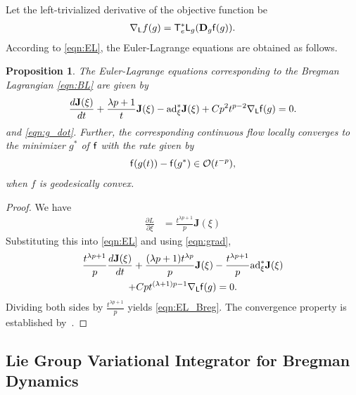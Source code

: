 \documentclass[letterpaper, 10pt, conference]{ieeeconf}
\newcommand{\deriv}[2]{\ensuremath{\frac{\partial #1}{\partial #2}}}
\newcommand{\T}{\ensuremath{\mathsf{T}}}
\renewcommand{\L}{\ensuremath{\mathsf{L}}}
\newcommand{\D}{\ensuremath{\mathbf{D}}}
\newcommand{\ad}{\ensuremath{\mathrm{ad}}}
\newtheorem{prop}{Proposition}
\begin{document}
Let the left-trivialized derivative of the objective function be
\begin{align}
    \nabla_\L f(g) = \T_e^*\L_g (\D_g \obj(g)).\label{eqn:grad}
\end{align}
According to \eqref{eqn:EL}, the Euler-Lagrange equations are obtained as follows.
\begin{prop}
    The Euler-Lagrange equations corresponding to the Bregman Lagrangian \eqref{eqn:BL} are given by
    \begin{align}
        \frac{d \mathbf{J}(\xi)}{dt} + \frac{\lambda p+1}{t}\mathbf{J}(\xi) - \ad^*_\xi \mathbf{J}(\xi)
        + Cp^2 t^{p-2} \nabla_\L \obj (g) =0.\label{eqn:EL_Breg}
    \end{align}
    and \eqref{eqn:g_dot}. 
    Further, the corresponding continuous flow locally converges to the minimizer $g^*$ of $\mathsf{f}$ with the rate given by
    \begin{align}
        \mathsf{f}(g(t)) - \mathsf{f}(g^*) \in \mathcal{O}(t^{-p}),
    \end{align}
    when $f$ is geodesically convex. 
\end{prop}
\begin{proof}
    We have
    \begin{align*}
        \deriv{L}{\xi} & = \frac{t^{\lambda p+1}}{p}\mathbf{J}(\xi)
    \end{align*}
    Substituting this into \eqref{eqn:EL} and using \eqref{eqn:grad}, 
    \begin{gather*}
        \frac{t^{\lambda p+1}}{p}\frac{d \mathbf{J}(\xi)}{dt} + \frac{(\lambda p+1)t^{\lambda p}}{p}\mathbf{J}(\xi) -\frac{t^{\lambda p+1}}{p} \ad^*_\xi \mathbf{J}(\xi) \\
        + Cpt^{(\lambda +1)p-1} \nabla_\L \obj(g) =0.
    \end{gather*}
    Dividing both sides by $\frac{t^{\lambda p+1}}{p}$ yields \eqref{eqn:EL_Breg}.
    The convergence property is established by~\cite[Theorem 3.2]{duruisseaux2021variational}.
\end{proof}

\subsection{Lie Group Variational Integrator for Bregman Dynamics}
\end{document}
